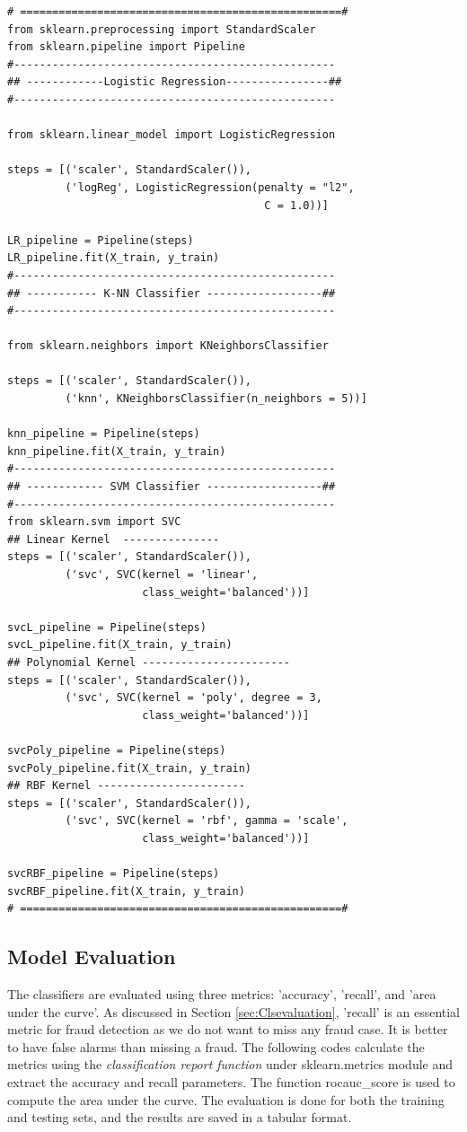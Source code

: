 \newpage
\begin{lstlisting}
# ==================================================#
from sklearn.preprocessing import StandardScaler
from sklearn.pipeline import Pipeline
#--------------------------------------------------
## ------------Logistic Regression----------------##
#--------------------------------------------------

from sklearn.linear_model import LogisticRegression

steps = [('scaler', StandardScaler()),
         ('logReg', LogisticRegression(penalty = "l2",
                                        C = 1.0))]

LR_pipeline = Pipeline(steps)
LR_pipeline.fit(X_train, y_train)
#--------------------------------------------------
## ----------- K-NN Classifier ------------------##
#--------------------------------------------------

from sklearn.neighbors import KNeighborsClassifier

steps = [('scaler', StandardScaler()),
         ('knn', KNeighborsClassifier(n_neighbors = 5))]

knn_pipeline = Pipeline(steps)
knn_pipeline.fit(X_train, y_train)
#--------------------------------------------------
## ------------ SVM Classifier ------------------##
#--------------------------------------------------
from sklearn.svm import SVC
## Linear Kernel  ---------------
steps = [('scaler', StandardScaler()),
         ('svc', SVC(kernel = 'linear',
                     class_weight='balanced'))]

svcL_pipeline = Pipeline(steps)
svcL_pipeline.fit(X_train, y_train)
## Polynomial Kernel -----------------------
steps = [('scaler', StandardScaler()),
         ('svc', SVC(kernel = 'poly', degree = 3,
                     class_weight='balanced'))]

svcPoly_pipeline = Pipeline(steps)
svcPoly_pipeline.fit(X_train, y_train)
## RBF Kernel -----------------------
steps = [('scaler', StandardScaler()),
         ('svc', SVC(kernel = 'rbf', gamma = 'scale',
                     class_weight='balanced'))]

svcRBF_pipeline = Pipeline(steps)
svcRBF_pipeline.fit(X_train, y_train)
# ==================================================#
\end{lstlisting}

\subsection{Model Evaluation}
The classifiers are evaluated using three metrics: 'accuracy', 'recall', and 'area under the curve'. As discussed in Section \ref{sec:Clsevaluation}, 'recall' is an essential metric for fraud detection as we do not want to miss any fraud case. It is better to have false alarms than missing a fraud. The following codes calculate the metrics using the \emph{classification report function} under sklearn.metrics module  and extract the accuracy and recall parameters. The function roc\-auc\_score is used to compute the area under the curve. The evaluation is done for both the training and testing sets, and the results are saved in a tabular format.

